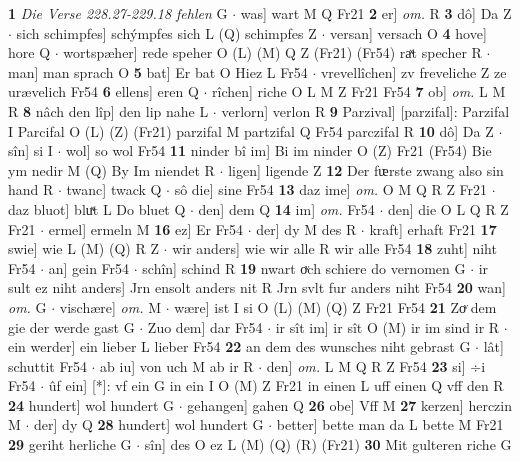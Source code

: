 \documentclass[8pt,a4paper,notitlepage]{article}
\begin{document}
\begin{table}[ht]
\begin{minipage}[t]{0.5\linewidth}
\textbf{1} \textit{Die Verse 228.27-229.18 fehlen} G   $\cdot$ was] wart M Q Fr21 \textbf{2} er] \textit{om.} R \textbf{3} dô] Da Z  $\cdot$ sich schimpfes] schýmpfes sich L (Q) schimpfes Z  $\cdot$ versan] versach O \textbf{4} hove] hore Q  $\cdot$ wortspæher] rede speher O (L) (M) Q Z (Fr21) (Fr54) raͯt specher R  $\cdot$ man] man sprach O \textbf{5} bat] Er bat O Hiez L Fr54  $\cdot$ vrevellîchen] zv freveliche Z ze urævelich Fr54 \textbf{6} ellens] eren Q  $\cdot$ rîchen] riche O L M Z Fr21 Fr54 \textbf{7} ob] \textit{om.} L M R \textbf{8} nâch den lîp] den lip nahe L  $\cdot$ verlorn] verlon R \textbf{9} Parzival] [parzifal]: Parzifal I Parcifal O (L) (Z) (Fr21) parzifal M partzifal Q Fr54 parczifal R \textbf{10} dô] Da Z  $\cdot$ sîn] si I  $\cdot$ wol] so wol Fr54 \textbf{11} ninder bî im] Bi im ninder O (Z) Fr21 (Fr54) Bie ym nedir M (Q) By Im niendet R  $\cdot$ ligen] ligende Z \textbf{12} Der fᵫrste zwang also sin hand R  $\cdot$ twanc] twack Q  $\cdot$ sô die] sine Fr54 \textbf{13} daz ime] \textit{om.} O M Q R Z Fr21  $\cdot$ daz bluot] bluͯt L Do bluet Q  $\cdot$ den] dem Q \textbf{14} im] \textit{om.} Fr54  $\cdot$ den] die O L Q R Z Fr21  $\cdot$ ermel] ermeln M \textbf{16} ez] Er Fr54  $\cdot$ der] dy M des R  $\cdot$ kraft] erhaft Fr21 \textbf{17} swie] wie L (M) (Q) R Z  $\cdot$ wir anders] wie wir alle R wir alle Fr54 \textbf{18} zuht] niht Fr54  $\cdot$ an] gein Fr54  $\cdot$ schîn] schind R \textbf{19} nwart oͮch schiere do vernomen G  $\cdot$ ir sult ez niht anders] Jrn ensolt anders nit R Jrn svlt fur anders niht Fr54 \textbf{20} wan] \textit{om.} G  $\cdot$ vischære] \textit{om.} M  $\cdot$ wære] ist I si O (L) (M) (Q) Z Fr21 Fr54 \textbf{21} Zoͮ dem gie der werde gast G  $\cdot$ Zuo dem] dar Fr54  $\cdot$ ir sît im] ir sît O (M) ir im sind ir R  $\cdot$ ein werder] ein lieber L lieber Fr54 \textbf{22} an dem des wunsches niht gebrast G  $\cdot$ lât] schuttit Fr54  $\cdot$ ab iu] von uch M ab ir R  $\cdot$ den] \textit{om.} L M Q R Z Fr54 \textbf{23} si] ÷i Fr54  $\cdot$ ûf ein] [*]: vf ein G in ein I O (M) Z Fr21 in einen L uff einen Q vff den R \textbf{24} hundert] wol hundert G  $\cdot$ gehangen] gahen Q \textbf{26} obe] Vff M \textbf{27} kerzen] herczin M  $\cdot$ der] dy Q \textbf{28} hundert] wol hundert G  $\cdot$ better] bette man da L bette M Fr21 \textbf{29} geriht herliche G  $\cdot$ sîn] des O ez L (M) (Q) (R) (Fr21) \textbf{30} Mit gulteren riche G \newline
\end{minipage}
\hspace{0.5cm}
\begin{minipage}[t]{0.5\linewidth}

\end{minipage}
\end{table}
\end{document}
